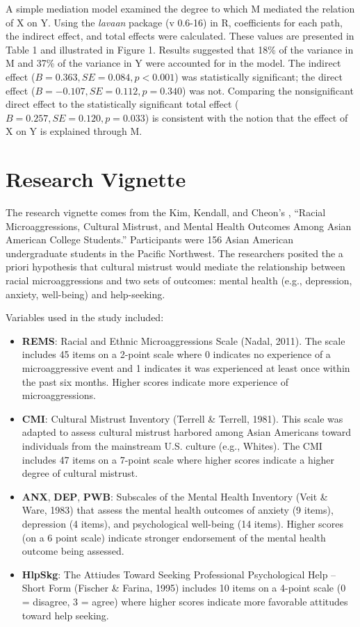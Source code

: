 \documentclass[
  11pt,
]{book}
\providecommand{\tightlist}{%
  \setlength{\itemsep}{0pt}\setlength{\parskip}{0pt}}
\begin{document}
A simple mediation model examined the degree to which M mediated the relation of X on Y. Using the \emph{lavaan} package (v 0.6-16) in R, coefficients for each path, the indirect effect, and total effects were calculated. These values are presented in Table 1 and illustrated in Figure 1. Results suggested that 18\% of the variance in M and 37\% of the variance in Y were accounted for in the model. The indirect effect (\(B = 0.363, SE = 0.084, p < 0.001\)) was statistically significant; the direct effect (\(B = -0.107, SE = 0.112, p = 0.340\)) was not. Comparing the nonsignificant direct effect to the statistically significant total effect (\(B = 0.257, SE = 0.120, p = 0.033\)) is consistent with the notion that the effect of X on Y is explained through M.

\hypertarget{research-vignette-4}{%
\section{Research Vignette}\label{research-vignette-4}}

The research vignette comes from the Kim, Kendall, and Cheon's \citeyearpar{kim_racial_2017}, ``Racial Microaggressions, Cultural Mistrust, and Mental Health Outcomes Among Asian American College Students.'' Participants were 156 Asian American undergraduate students in the Pacific Northwest. The researchers posited the a priori hypothesis that cultural mistrust would mediate the relationship between racial microaggressions and two sets of outcomes: mental health (e.g., depression, anxiety, well-being) and help-seeking.

Variables used in the study included:

\begin{itemize}
\tightlist
\item
  \textbf{REMS}: Racial and Ethnic Microaggressions Scale (Nadal, 2011). The scale includes 45 items on a 2-point scale where 0 indicates no experience of a microaggressive event and 1 indicates it was experienced at least once within the past six months. Higher scores indicate more experience of microaggressions.
\item
  \textbf{CMI}: Cultural Mistrust Inventory (Terrell \& Terrell, 1981). This scale was adapted to assess cultural mistrust harbored among Asian Americans toward individuals from the mainstream U.S. culture (e.g., Whites). The CMI includes 47 items on a 7-point scale where higher scores indicate a higher degree of cultural mistrust.
\item
  \textbf{ANX}, \textbf{DEP}, \textbf{PWB}: Subscales of the Mental Health Inventory (Veit \& Ware, 1983) that assess the mental health outcomes of anxiety (9 items), depression (4 items), and psychological well-being (14 items). Higher scores (on a 6 point scale) indicate stronger endorsement of the mental health outcome being assessed.
\item
  \textbf{HlpSkg}: The Attiudes Toward Seeking Professional Psychological Help -- Short Form (Fischer \& Farina, 1995) includes 10 items on a 4-point scale (0 = disagree, 3 = agree) where higher scores indicate more favorable attitudes toward help seeking.
\end{itemize}
\end{document}
